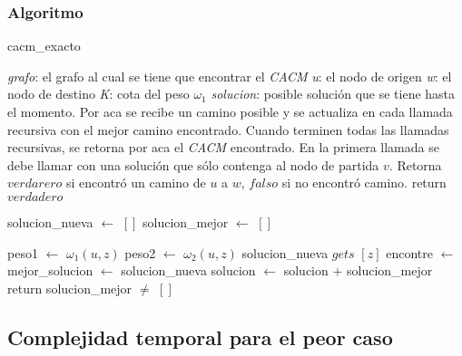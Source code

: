 \subsubsection{Algoritmo}

\begin{algorithm}[!h]
\caption{cacm\_exacto} \label{exacto:pseudo}
\end{algorithm}
\begin{algorithmic}[1]
	\Require \emph{grafo}: el grafo al cual se tiene que encontrar el \emph{CACM}
	\Require \emph{u}: el nodo de origen
	\Require \emph{w}: el nodo de destino
	\Require \emph{K}: cota del peso $\omega_1$
	\Require \emph{solucion}: posible soluci\'on que se tiene hasta el momento. Por aca se recibe un camino posible y se actualiza en cada llamada recursiva con el mejor camino encontrado. Cuando terminen todas las llamadas recursivas, se retorna por aca el \emph{CACM} encontrado. En la primera llamada se debe llamar con una soluci\'on que s\'olo contenga al nodo de partida $v$.
	\Statex
	\Ensure Retorna $verdarero$ si encontr\'o un camino de $u$ a $w$, $falso$ si no encontr\'o camino.
	\Statex
			\State return $verdadero$
		\EndIf
		
		\State solucion\_nueva $\gets$ $[]$
		\State solucion\_mejor $\gets$ $[]$

		\State {}
			\State peso1 $\gets$ $\omega_1({u, z})$
			\State peso2 $\gets$ $\omega_2({u, z})$
				\State {}
				\State solucion\_nueva $gets$ $[z]$
				\State encontre $\gets$ 
					\State mejor\_solucion $\gets$ solucion\_nueva
				\EndIf
				\State {}
			\EndIf
		\EndIf
		\EndFor
		\State {}
			\State solucion $\gets$ solucion $+$ solucion\_mejor
		\EndIf
		\State return solucion\_mejor $\neq$ $[]$
	\EndProcedure
\end{algorithmic}

\subsection{Complejidad temporal para el peor caso} \label{exacto:complejidad}

